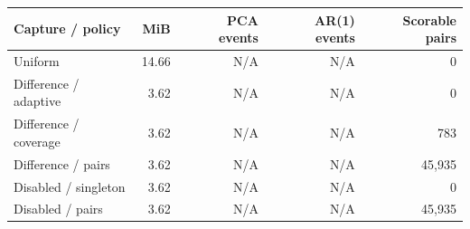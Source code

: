 \begin{tabular}{lrrrr}
\toprule
Capture / policy & MiB & PCA events & AR(1) events & Scorable pairs \\
\midrule
Uniform & 14.66 & N/A & N/A & 0 \\
Difference / adaptive & 3.62 & N/A & N/A & 0 \\
Difference / coverage & 3.62 & N/A & N/A & 783 \\
Difference / pairs & 3.62 & N/A & N/A & 45,935 \\
Disabled / singleton & 3.62 & N/A & N/A & 0 \\
Disabled / pairs & 3.62 & N/A & N/A & 45,935 \\
\bottomrule
\end{tabular}
